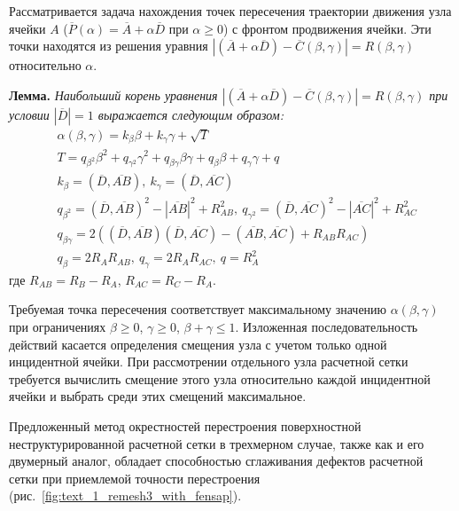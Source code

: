 \documentclass[a4paper,14pt]{extarticle}                     %
\theoremstyle{plain}                                         %
\begin{document}
Рассматривается задача нахождения точек пересечения траектории движения узла ячейки $A$ ($\overline{P}(\alpha) = \overline{A} + \alpha \overline{D}$ при $\alpha \ge 0$) с фронтом продвижения ячейки.
Эти точки находятся из решения уравния $|(\overline{A} + \alpha \overline{D}) - \overline{C}(\beta, \gamma)| = R(\beta, \gamma)$ относительно $\alpha$.

\textbf{Лемма.} \textit{Наибольший корень уравнения $|(\overline{A} + \alpha \overline{D}) - \overline{C}(\beta, \gamma)| = R(\beta, \gamma)$ при условии $|\overline{D}| = 1$ выражается следующим образом:
\begin{equation*}
	\begin{aligned}
		& \alpha(\beta, \gamma) = k_{\beta} \beta + k_{\gamma} \gamma + \sqrt{T} \\
		& T = q_{\beta^2} \beta^2 + q_{\gamma^2} \gamma^2 + q_{\beta \gamma} \beta \gamma + q_{\beta} \beta + q_{\gamma} \gamma + q \\
		& k_{\beta} = (\overline{D}, \overline{AB}), \ k_{\gamma} = (\overline{D}, \overline{AC}) \\
		& q_{\beta^2} = (\overline{D}, \overline{AB})^2 - |\overline{AB}|^2 + R_{AB}^2, \ q_{\gamma^2} = (\overline{D}, \overline{AC})^2 - |\overline{AC}|^2 + R_{AC}^2 \\
		& q_{\beta \gamma} = 2 \left( (\overline{D}, \overline{AB}) (\overline{D}, \overline{AC}) - (\overline{AB}, \overline{AC}) + R_{AB}R_{AC} \right) \\
		& q_{\beta} = 2 R_A R_{AB}, \ q_{\gamma} = 2 R_A R_{AC}, \ q = R_A^2
	\end{aligned}
\end{equation*}}
где $R_{AB} = R_B - R_A$, $R_{AC} = R_C - R_A$.

Требуемая точка пересечения соответствует максимальному значению $\alpha(\beta, \gamma)$ при ограничениях $\beta \ge 0$, $\gamma \ge 0$, $\beta + \gamma \le 1$.
Изложенная последовательность действий касается определения смещения узла с учетом только одной инцидентной ячейки.
При рассмотрении отдельного узла расчетной сетки требуется вычислить смещение этого узла относительно каждой инцидентной ячейки и выбрать среди этих смещений максимальное.

Предложенный метод окрестностей перестроения поверхностной неструктурированной расчетной сетки в трехмерном случае, также как и его двумерный аналог, обладает способностью сглаживания дефектов расчетной сетки при приемлемой точности перестроения (рис.~\ref{fig:text_1_remesh3_with_fensap}).
\end{document}
